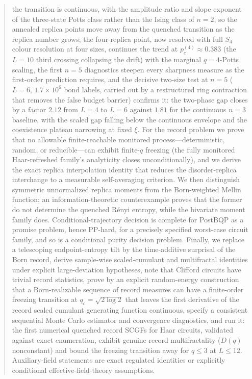 \documentclass[aps,prx,reprint,superscriptaddress,nobibnotes,longbibliography]{revtex4-2}
\theoremstyle{remark}
\begin{document}
\begin{abstract}
the transition is continuous, with the amplitude ratio and slope exponent of the three-state Potts class rather than the Ising class of $n=2$, so the annealed replica points move away from the quenched transition as the replica number grows; the four-replica point, now resolved with full $S_4$ colour resolution at four sizes, continues the trend at $p_c^{(4)}\approx0.383$ (the $L=10$ third crossing collapsing the drift) with the marginal $q=4$-Potts scaling, the first $n=5$ diagnostics steepen every sharpness measure as the first-order prediction requires, and the decisive two-size test at $n=5$ ($L=6$, $1.7\times10^6$ bond labels, carried out by a restructured ring contraction that removes the false budget barrier) confirms it: the two-phase gap closes by a factor $2.12$ from $L=4$ to $L=6$ against $1.81$ for the continuous $n=3$ baseline, with the scaled gap falling below the continuous envelope and the coexistence plateau narrowing at fixed $\xi$.  For the record problem we prove that no allowable finite-reachable monitored process---deterministic, random, or reducible---can exhibit finite-$q$ freezing (the fully monitored Haar-refreshed family's analyticity closes unconditionally), and we derive the exact replica interpolation identity that reduces the disorder-replica interchange to a measurable self-averaging criterion.  We then distinguish symmetric unnormalized replica moments from the Born-weighted Mellin function; an information-theoretic counterexample proves that the former do not determine the quenched R\'enyi entropy, while the bivariate moment family does.  Conditional-trajectory decision is complete for PostBQP as a promise problem, hence PP-hard, for a precisely specified worst-case circuit family, and so is a conditional purity decision problem.  Finally, we replace a telescoping endpoint-entropy tilt by the time-additive surprisal of the Born record, derive sample-wise scaled-cumulant and multifractal identities under explicit large-deviation hypotheses, note that Clifford circuits have trivial record statistics, prove by an explicit random-energy construction that a Born-realizable sequence of record measures can have a finite-order freezing transition at $q_c=\sqrt{2\log2}$ that leaves the first derivative of the record scaled cumulant generating function continuous, specify a consistent sequential Monte Carlo estimator and convergence diagnostics, and run it: the first numerical quenched record SCGFs for Haar circuits, validated against exact enumeration, exhibit genuine record multifractality ($D(q)$ nonconstant) and bound the freezing transition away for $q\le3$ at $L\le12$.  Auxiliary-field statements are exact regulated identities or explicitly conditional effective-field-theory assumptions.
\end{abstract}
\end{document}
